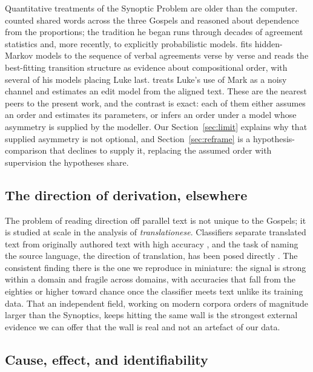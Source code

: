 \documentclass[11pt,letterpaper]{article}
\begin{document}
Quantitative treatments of the Synoptic Problem are older than the computer. \citet{honore1968} counted shared words across the three Gospels and reasoned about dependence from the proportions; the tradition he began runs through decades of agreement statistics and, more recently, to explicitly probabilistic models. \citet{abakuks2015} fits hidden-Markov models to the sequence of verbal agreements verse by verse and reads the best-fitting transition structure as evidence about compositional order, with several of his models placing Luke last. \citet{lee2007} treats Luke's use of Mark as a noisy channel and estimates an edit model from the aligned text. These are the nearest peers to the present work, and the contrast is exact: each of them either assumes an order and estimates its parameters, or infers an order under a model whose asymmetry is supplied by the modeller. Our Section~\ref{sec:limit} explains why that supplied asymmetry is not optional, and Section~\ref{sec:reframe} is a hypothesis-comparison that declines to supply it, replacing the assumed order with supervision the hypotheses share.

\subsection{The direction of derivation, elsewhere}

The problem of reading direction off parallel text is not unique to the Gospels; it is studied at scale in the analysis of \emph{translationese}. Classifiers separate translated text from originally authored text with high accuracy \citep{baroni2006,koppel2011}, and the task of naming the source language, the direction of translation, has been posed directly \citep{rabinovich2015,sominsky2019}. The consistent finding there is the one we reproduce in miniature: the signal is strong within a domain and fragile across domains, with accuracies that fall from the eighties or higher toward chance once the classifier meets text unlike its training data. That an independent field, working on modern corpora orders of magnitude larger than the Synoptics, keeps hitting the same wall is the strongest external evidence we can offer that the wall is real and not an artefact of our data.

\subsection{Cause, effect, and identifiability}
\end{document}
